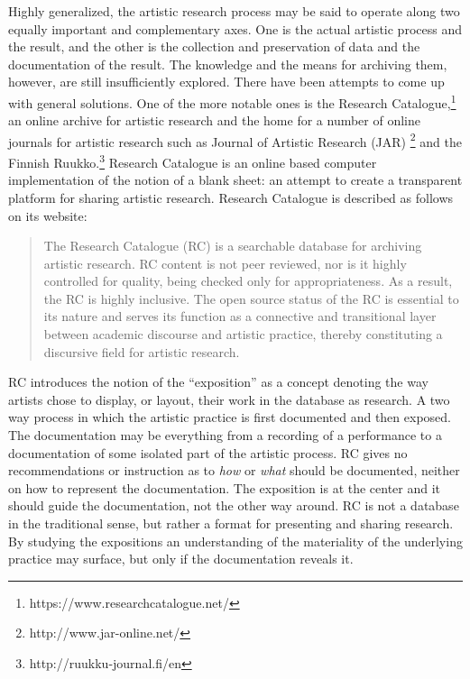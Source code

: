 \documentclass[11pt,a4paper]{article}
\begin{document}
Highly generalized, the artistic research process may be said to operate along two equally important and complementary axes. One is the actual artistic process and the result, and the other is the collection and preservation of data and the documentation of the result. The knowledge and the means for archiving them, however, are still insufficiently explored. There have been attempts to come up with general solutions. One of the more notable ones is the Research Catalogue,\footnote{https://www.researchcatalogue.net/} an online archive for artistic research and the home for a number of online journals for artistic research such as Journal of Artistic Research (JAR) \footnote{http://www.jar-online.net/} and the Finnish Ruukko.\footnote{http://ruukku-journal.fi/en} Research Catalogue is an online based computer implementation of the notion of a blank sheet: an attempt to create a transparent platform for sharing artistic research. Research Catalogue is described as follows on its website:

\begin{quote}
  The Research Catalogue (RC) is a searchable database for archiving artistic research. RC content is not peer reviewed, nor is it highly controlled for quality, being checked only for appropriateness. As a result, the RC is highly inclusive. The open source status of the RC is essential to its nature and serves its function as a connective and transitional layer between academic discourse and artistic practice, thereby constituting a discursive field for artistic research. \citep{rc2017}
\end{quote}

RC introduces the notion of the ``exposition'' as a concept denoting the way artists chose to display, or layout, their work in the database as research. A two way process in which the artistic practice is first documented and then exposed. The documentation may be everything from a recording of a performance to a documentation of some isolated part of the artistic process. RC gives no recommendations or instruction as to \emph{how} or \emph{what} should be documented, neither on how to represent the documentation. The exposition is at the center and it should guide the documentation, not the other way around. RC is not a database in the traditional sense, but rather a format for presenting and sharing research. By studying the expositions an understanding of the materiality of the underlying practice may surface, but only if the documentation reveals it.
\end{document}
